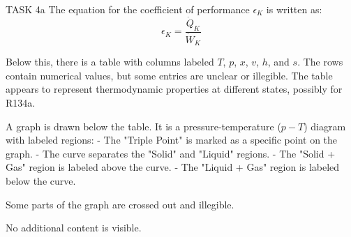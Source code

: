 TASK 4a  
The equation for the coefficient of performance \( \epsilon_K \) is written as:  
\[
\epsilon_K = \frac{\dot{Q}_K}{\dot{W}_K}
\]  

Below this, there is a table with columns labeled \( T \), \( p \), \( x \), \( v \), \( h \), and \( s \). The rows contain numerical values, but some entries are unclear or illegible. The table appears to represent thermodynamic properties at different states, possibly for R134a.  

A graph is drawn below the table. It is a pressure-temperature (\( p-T \)) diagram with labeled regions:  
- The "Triple Point" is marked as a specific point on the graph.  
- The curve separates the "Solid" and "Liquid" regions.  
- The "Solid + Gas" region is labeled above the curve.  
- The "Liquid + Gas" region is labeled below the curve.  

Some parts of the graph are crossed out and illegible.  

No additional content is visible.